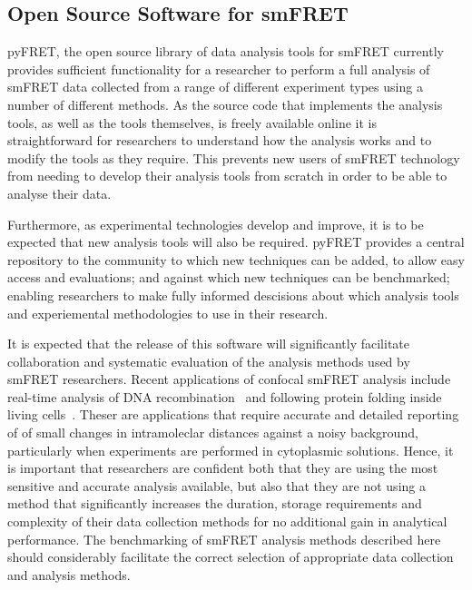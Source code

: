 \subsection{Open Source Software for smFRET}
pyFRET, the open source library of data analysis tools for smFRET currently provides sufficient functionality for a researcher to perform a full analysis of smFRET data collected from a range of different experiment types using a number of different methods. As the source code that implements the analysis tools, as well as the tools themselves, is freely available online it is straightforward for researchers to understand how the analysis works and to modify the tools as they require. This prevents new users of smFRET technology from needing to develop their analysis tools from scratch in order to be able to analyse their data. 

Furthermore, as experimental technologies develop and improve, it is to be expected that new analysis tools will also be required. pyFRET provides a central repository to the community to which new techniques can be added, to allow easy access and evaluations; and against which new techniques can be benchmarked; enabling researchers to make fully informed descisions about which analysis tools and experiemental methodologies to use in their research.

It is expected that the release of this software will significantly facilitate collaboration and systematic evaluation of the analysis methods used by smFRET researchers. Recent applications of confocal smFRET analysis include real-time analysis of DNA recombination~\cite{May2015} and following protein folding inside living cells~\cite{Sustarsic2015}. Theser are applications that require accurate and detailed reporting of of small changes in intramoleclar distances against a noisy background, particularly when experiments are performed in cytoplasmic solutions. Hence, it is important that researchers are confident both that they are using the most sensitive and accurate analysis available, but also that they are not using a method that significantly increases the duration, storage requirements and complexity of their data collection methods for no additional gain in analytical performance. The benchmarking of smFRET analysis methods described here should considerably facilitate the correct selection of appropriate data collection and analysis methods.

